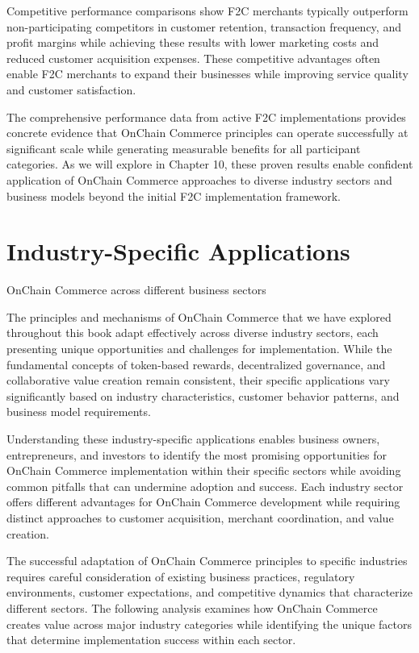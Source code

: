 \documentclass[
  Letterpaper,
]{scrbook}
\begin{document}
Competitive performance comparisons show F2C merchants typically
outperform non-participating competitors in customer retention,
transaction frequency, and profit margins while achieving these results
with lower marketing costs and reduced customer acquisition expenses.
These competitive advantages often enable F2C merchants to expand their
businesses while improving service quality and customer satisfaction.

The comprehensive performance data from active F2C implementations
provides concrete evidence that OnChain Commerce principles can operate
successfully at significant scale while generating measurable benefits
for all participant categories. As we will explore in Chapter 10, these
proven results enable confident application of OnChain Commerce
approaches to diverse industry sectors and business models beyond the
initial F2C implementation framework.

\chapter{Industry-Specific
Applications}\label{sec-industry-applications}

OnChain Commerce across different business sectors

The principles and mechanisms of OnChain Commerce that we have explored
throughout this book adapt effectively across diverse industry sectors,
each presenting unique opportunities and challenges for implementation.
While the fundamental concepts of token-based rewards, decentralized
governance, and collaborative value creation remain consistent, their
specific applications vary significantly based on industry
characteristics, customer behavior patterns, and business model
requirements.

Understanding these industry-specific applications enables business
owners, entrepreneurs, and investors to identify the most promising
opportunities for OnChain Commerce implementation within their specific
sectors while avoiding common pitfalls that can undermine adoption and
success. Each industry sector offers different advantages for OnChain
Commerce development while requiring distinct approaches to customer
acquisition, merchant coordination, and value creation.

The successful adaptation of OnChain Commerce principles to specific
industries requires careful consideration of existing business
practices, regulatory environments, customer expectations, and
competitive dynamics that characterize different sectors. The following
analysis examines how OnChain Commerce creates value across major
industry categories while identifying the unique factors that determine
implementation success within each sector.
\end{document}

